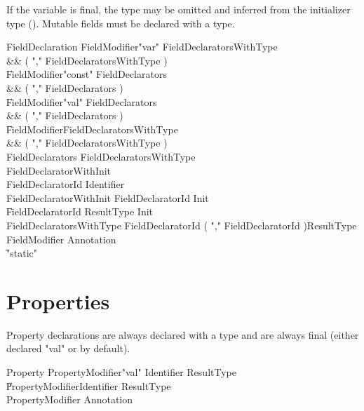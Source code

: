 If the variable is final,
the type may be omitted and
inferred from the initializer type ().
Mutable fields must be declared with a type.

\begin{grammar}
FieldDeclaration
        \: FieldModifier\star \xcd"var" FieldDeclaratorsWithType \\&& ( \xcd"," FieldDeclaratorsWithType )\star \\
        \| FieldModifier\star \xcd"const" FieldDeclarators \\&& ( \xcd"," FieldDeclarators )\star \\
        \| FieldModifier\star \xcd"val" FieldDeclarators \\&& ( \xcd"," FieldDeclarators )\star \\
        \| FieldModifier\star FieldDeclaratorsWithType \\&& ( \xcd"," FieldDeclaratorsWithType )\star \\
FieldDeclarators
        \: FieldDeclaratorsWithType \\
        \: FieldDeclaratorWithInit \\
FieldDeclaratorId
        \: Identifier  \\
FieldDeclaratorWithInit
        \: FieldDeclaratorId Init \\
        \| FieldDeclaratorId ResultType Init \\
FieldDeclaratorsWithType
        \: FieldDeclaratorId ( \xcd"," FieldDeclaratorId )\star ResultType \\
FieldModifier \: Annotation \\
                \| \xcd"static" \\
\end{grammar}

\section{Properties}
Property declarations are always declared with a type and are
always final (either declared \xcd"val" or by default).

\begin{grammar}
Property
        \: PropertyModifier\star \xcd"val" Identifier ResultType \\
        \| PropertyModifier\star Identifier ResultType \\
PropertyModifier \: Annotation \\
\end{grammar}
